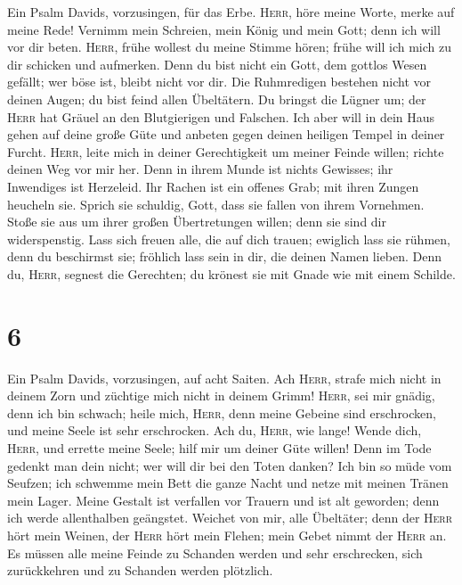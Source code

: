  Ein Psalm Davids, vorzusingen, für das Erbe.
 \textsc{Herr}, höre meine Worte, merke auf meine Rede!
 Vernimm mein Schreien, mein König und mein Gott; denn ich
will vor dir beten.  \textsc{Herr}, frühe wollest du meine
Stimme hören; frühe will ich mich zu dir schicken und aufmerken.
 Denn du bist nicht ein Gott, dem gottlos Wesen gefällt;
wer böse ist, bleibt nicht vor dir.  Die Ruhmredigen
bestehen nicht vor deinen Augen; du bist feind allen Übeltätern.
 Du bringst die Lügner um; der \textsc{Herr} hat Gräuel an
den Blutgierigen und Falschen.  Ich aber will in dein Haus
gehen auf deine große Güte und anbeten gegen deinen heiligen Tempel in
deiner Furcht.  \textsc{Herr}, leite mich in deiner
Gerechtigkeit um meiner Feinde willen; richte deinen Weg vor mir her.
 Denn in ihrem Munde ist nichts Gewisses; ihr Inwendiges
ist Herzeleid. Ihr Rachen ist ein offenes Grab; mit ihren Zungen
heucheln sie.  Sprich sie schuldig, Gott, dass sie fallen
von ihrem Vornehmen. Stoße sie aus um ihrer großen Übertretungen willen;
denn sie sind dir widerspenstig.  Lass sich freuen alle,
die auf dich trauen; ewiglich lass sie rühmen, denn du beschirmst sie;
fröhlich lass sein in dir, die deinen Namen lieben.  Denn
du, \textsc{Herr}, segnest die Gerechten; du krönest sie mit Gnade wie
mit einem Schilde.

\hypertarget{section-5}{%
\section{6}\label{section-5}}

 Ein Psalm Davids, vorzusingen, auf acht Saiten.
 Ach \textsc{Herr}, strafe mich nicht in deinem Zorn und
züchtige mich nicht in deinem Grimm!  \textsc{Herr}, sei
mir gnädig, denn ich bin schwach; heile mich, \textsc{Herr}, denn meine
Gebeine sind erschrocken,  und meine Seele ist sehr
erschrocken. Ach du, \textsc{Herr}, wie lange!  Wende
dich, \textsc{Herr}, und errette meine Seele; hilf mir um deiner Güte
willen!  Denn im Tode gedenkt man dein nicht; wer will dir
bei den Toten danken?  Ich bin so müde vom Seufzen; ich
schwemme mein Bett die ganze Nacht und netze mit meinen Tränen mein
Lager.  Meine Gestalt ist verfallen vor Trauern und ist
alt geworden; denn ich werde allenthalben geängstet. 
Weichet von mir, alle Übeltäter; denn der \textsc{Herr} hört mein
Weinen,  der \textsc{Herr} hört mein Flehen; mein Gebet
nimmt der \textsc{Herr} an.  Es müssen alle meine Feinde
zu Schanden werden und sehr erschrecken, sich zurückkehren und zu
Schanden werden plötzlich.


